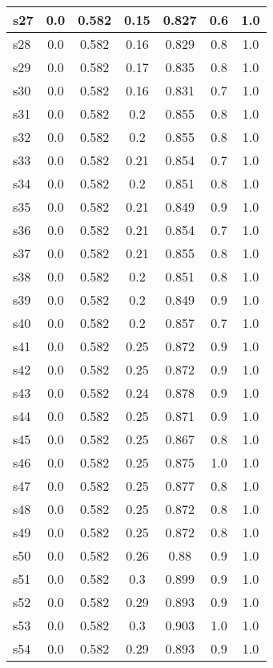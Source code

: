 \documentclass{article}
\begin{document}
\begin{tabular}{|l|c|c|c|c|c|c|}
\hline
s27 &0.0 & 0.582 & 0.15 & 0.827 & 0.6 & 1.0\\
\hline
s28 &0.0 & 0.582 & 0.16 & 0.829 & 0.8 & 1.0\\
\hline
s29 &0.0 & 0.582 & 0.17 & 0.835 & 0.8 & 1.0\\
\hline
s30 &0.0 & 0.582 & 0.16 & 0.831 & 0.7 & 1.0\\
\hline
s31 &0.0 & 0.582 & 0.2 & 0.855 & 0.8 & 1.0\\
\hline
s32 &0.0 & 0.582 & 0.2 & 0.855 & 0.8 & 1.0\\
\hline
s33 &0.0 & 0.582 & 0.21 & 0.854 & 0.7 & 1.0\\
\hline
s34 &0.0 & 0.582 & 0.2 & 0.851 & 0.8 & 1.0\\
\hline
s35 &0.0 & 0.582 & 0.21 & 0.849 & 0.9 & 1.0\\
\hline
s36 &0.0 & 0.582 & 0.21 & 0.854 & 0.7 & 1.0\\
\hline
s37 &0.0 & 0.582 & 0.21 & 0.855 & 0.8 & 1.0\\
\hline
s38 &0.0 & 0.582 & 0.2 & 0.851 & 0.8 & 1.0\\
\hline
s39 &0.0 & 0.582 & 0.2 & 0.849 & 0.9 & 1.0\\
\hline
s40 &0.0 & 0.582 & 0.2 & 0.857 & 0.7 & 1.0\\
\hline
s41 &0.0 & 0.582 & 0.25 & 0.872 & 0.9 & 1.0\\
\hline
s42 &0.0 & 0.582 & 0.25 & 0.872 & 0.9 & 1.0\\
\hline
s43 &0.0 & 0.582 & 0.24 & 0.878 & 0.9 & 1.0\\
\hline
s44 &0.0 & 0.582 & 0.25 & 0.871 & 0.9 & 1.0\\
\hline
s45 &0.0 & 0.582 & 0.25 & 0.867 & 0.8 & 1.0\\
\hline
s46 &0.0 & 0.582 & 0.25 & 0.875 & 1.0 & 1.0\\
\hline
s47 &0.0 & 0.582 & 0.25 & 0.877 & 0.8 & 1.0\\
\hline
s48 &0.0 & 0.582 & 0.25 & 0.872 & 0.8 & 1.0\\
\hline
s49 &0.0 & 0.582 & 0.25 & 0.872 & 0.8 & 1.0\\
\hline
s50 &0.0 & 0.582 & 0.26 & 0.88 & 0.9 & 1.0\\
\hline
s51 &0.0 & 0.582 & 0.3 & 0.899 & 0.9 & 1.0\\
\hline
s52 &0.0 & 0.582 & 0.29 & 0.893 & 0.9 & 1.0\\
\hline
s53 &0.0 & 0.582 & 0.3 & 0.903 & 1.0 & 1.0\\
\hline
s54 &0.0 & 0.582 & 0.29 & 0.893 & 0.9 & 1.0\\
\hline

\end{tabular}
\end{document}
